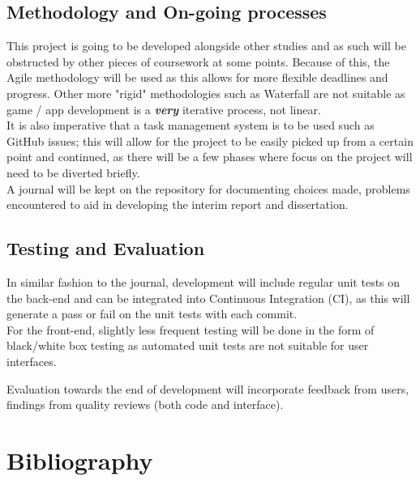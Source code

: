\documentclass[11pt]{article}
\begin{document}
{\subsection*{Methodology and On-going processes}

This project is going to be developed alongside other studies and as such will be obstructed by other pieces of coursework at some points. Because of this, the Agile methodology will be used as this allows for more flexible deadlines and progress. Other more "rigid" methodologies such as Waterfall are not suitable as game / app development is a \textbf{\textit{very}} iterative process, not linear. \\ 


It is also imperative that a task management system is to be used such as GitHub issues; this will allow for the project to be easily picked up from a certain point and continued, as there will be a few phases where focus on the project will need to be diverted briefly. \\

A journal will be kept on the repository for documenting choices made, problems encountered to aid in developing the interim report and dissertation. \\

\subsection*{Testing and Evaluation}

In similar fashion to the journal, development will include regular unit tests on the back-end and can be integrated into Continuous Integration (CI), as this will generate a pass or fail on the unit tests with each commit.  \\

For the front-end, slightly less frequent testing will be done in the form of black/white box testing as automated unit tests are not suitable for user interfaces. 

Evaluation towards the end of development will incorporate feedback from users, findings from quality reviews (both code and interface). 




\newpage
\section*{Bibliography}



}
\end{document}
